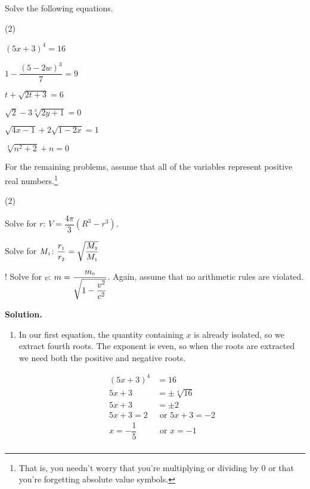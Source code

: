 \begin{ex}\label{radicaleqnreview}  Solve the following equations.


\begin{tasks}(2)

\task  $(5x +3)^{4} = 16$

\task  $1 - \dfrac{(5-2w)^3}{7} = 9$

\task  $t + \sqrt{2t+3} = 6$

\task $\sqrt{2} - 3\sqrt[3]{2y+1} = 0$ 

\task  $\sqrt{4x-1}  + 2\sqrt{1 - 2x} = 1$

\task  $\sqrt[4]{n^2 + 2} + n = 0$

\end{tasks}

For the remaining problems, assume that all of the variables represent positive real numbers.\footnote{That is, you needn't worry that you're multiplying or dividing by $0$ or that you're forgetting absolute value symbols.}

\begin{tasks}[resume](2)

\task  Solve for $r$:  $V = \dfrac{4\pi}{3}(R^3 - r^3)$.

\task  Solve for $M_{\text{\tiny$1$}}$:  $\dfrac{r_{\text{\tiny$1$}}}{r_{\text{\tiny$2$}}} = \sqrt{\dfrac{M_{\text{\tiny$2$}}}{M_{\text{\tiny$1$}}}}$

\task!  Solve for $v$:  $m = \dfrac{m_{\text{\tiny$0$}}}{\sqrt{1 - \dfrac{v^2}{c^2}}}$.  Again, assume that no arithmetic rules are violated.

\end{tasks}


{\bf Solution.}

\begin{enumerate}

\item  In our first equation, the quantity containing $x$ is already isolated, so we extract fourth roots. The exponent is even, so when the roots are extracted we need both the positive and negative roots. 

\begin{align*}
(5x +3)^{4} & = 16 \\ 
5x+3 & = \pm \sqrt[4]{16} \tag{Extract fourth roots} \\ 
5x + 3 & = \pm 2 \\ 
5x+3 = 2 & \text{ or } 5x+3 = -2 \\
x = -\dfrac{1}{5} & \text{ or } x = -1 \\
\end{align*}


\end{enumerate}
\end{ex}
